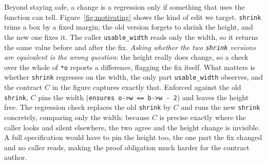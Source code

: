 \documentclass[conference]{IEEEtran}
\theoremstyle{definition}
\theoremstyle{remark}
\begin{document}
Beyond staying safe, a change is a
regression only if something that uses the function can tell.
Figure~\ref{fig:motivating} shows the kind of edit we target.
\texttt{shrink} trims a box by a fixed margin; the old version forgets
to shrink the height, and the new one fixes it. The caller
\texttt{usable\_width} reads only the width, so it returns the same
value before and after the fix. \textit{Asking whether the two \texttt{shrink}
versions are equivalent is the wrong question}: the height really does
change, so a check over the whole of \texttt{*o} reports a difference,
flagging the fix itself. What matters is whether \texttt{shrink}
regresses on the width, the only part \texttt{usable\_width} observes,
and the contract $C$ in the figure captures exactly that. Enforced
against the old \texttt{shrink}, $C$ pins the width
(\texttt{ensures o->w == b->w - 2}) and leaves the height free. The
regression check replaces the old \texttt{shrink} by $C$ and runs the
new \texttt{shrink} concretely, comparing only the width: because $C$ is
precise exactly where the caller looks and silent elsewhere, the two
agree and the height change is invisible. A full specification would
have to pin the height too, the one part the fix changed and no caller
reads, making the proof obligation much harder for the contract author.
\end{document}
